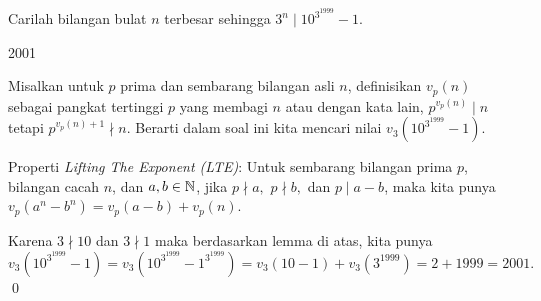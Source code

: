 \documentclass[11pt]{scrartcl}
\begin{document}
	\begin{soalbaru}
		Carilah bilangan bulat $n$ terbesar sehingga $3^n \mid 10^{3^{1999}} - 1$.
		
		\begin{jawaban}
		2001
		\end{jawaban}
		\begin{solusi}
		Misalkan untuk $p$ prima dan sembarang bilangan asli $n$, definisikan $v_p(n)$ sebagai pangkat tertinggi $p$ yang membagi $n$ atau dengan kata lain, $p^{v_p(n)} \mid n$ tetapi $p^{v_p(n)+1} \nmid n$. Berarti dalam soal ini kita mencari nilai $v_3(10^{3^{1999}} - 1)$.
		
		\begin{lemmarev}
			Properti \textit{Lifting The Exponent (LTE)}: Untuk sembarang bilangan prima $p$, bilangan cacah $n$, dan $a,b \in \mathbb N$, jika $p\nmid a,$ $ p \nmid b,$ dan $p \mid a-b$, maka kita punya $v_p(a^n-b^n) = v_p(a-b)+v_p(n)$.
		\end{lemmarev}
		
		Karena $3 \nmid 10$ dan $3 \nmid 1$ maka berdasarkan lemma di atas, kita punya\\ $v_3(10^{3^{1999}} - 1) = v_3(10^{3^{1999}} - 1^{3^{1999}})= v_3(10-1)+v_3(3^{1999})=2+1999=2001.$ \qed
		\end{solusi}
	\end{soalbaru}
	
\end{document}
